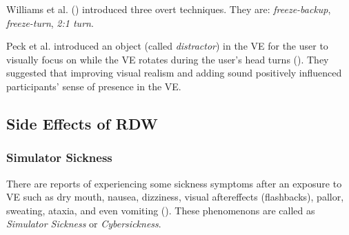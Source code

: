 \documentclass[12pt]{article}
\begin{document}
Williams et al. (\cite{williams2007exploring}) introduced three overt techniques. They are: \emph{freeze-backup}, \emph{freeze-turn}, \emph{2:1 turn}.

Peck et al. introduced an object (called \emph{distractor}) in the VE for the user to visually focus on while the VE rotates during the user's head turns (\cite{peck2011evaluation}). They suggested that improving visual realism and adding sound positively influenced participants' sense of presence in the VE.

\subsection{Side Effects of RDW}

\subsubsection{Simulator Sickness}

There are reports of experiencing some sickness symptoms after an exposure to VE such as dry mouth, nausea, dizziness, visual aftereffects (flashbacks), pallor, sweating, ataxia, and even vomiting (\cite{razzaque2005redirected}). These phenomenons are called as \emph{Simulator Sickness} or \emph{Cybersickness}.

\newpage

\printbibliography
\end{document}
